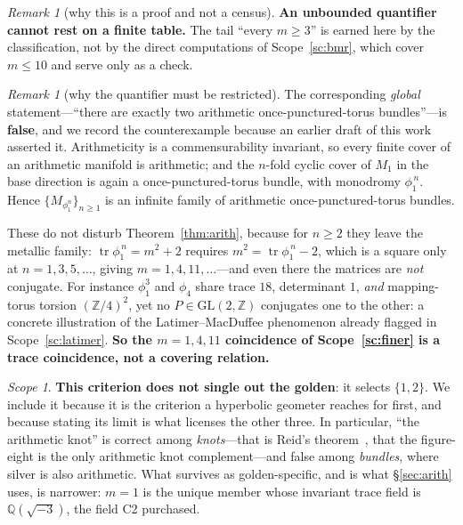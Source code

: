 \documentclass[11pt,reqno]{amsart}
\theoremstyle{plain}
\theoremstyle{definition}
\theoremstyle{remark}
\newtheorem{scope}[theorem]{Scope}
\newtheorem{remark}[theorem]{Remark}
\newcommand{\Q}{\mathbb{Q}}
\newcommand{\Z}{\mathbb{Z}}
\newcommand{\GL}{\mathrm{GL}}
\newcommand{\tr}{\operatorname{tr}}
\begin{document}
\begin{remark}[why this is a proof and not a census]
\textbf{An unbounded quantifier cannot rest on a finite table.} The tail
``every $m\ge3$'' is earned here by the classification, not by the direct computations of
Scope~\ref{sc:bmr}, which cover $m\le10$ and serve only as a check.
\end{remark}

\begin{remark}[why the quantifier must be restricted]\label{rem:notglobal}
The corresponding \emph{global} statement---``there are exactly two arithmetic
once-punctured-torus bundles''---is \textbf{false}, and we record the counterexample
because an earlier draft of this work asserted it. Arithmeticity is a commensurability
invariant, so every finite cover of an arithmetic manifold is arithmetic; and the
$n$-fold cyclic cover of $M_1$ in the base direction is again a once-punctured-torus
bundle, with monodromy $\phi_1^{\,n}$. Hence $\{M_{\phi_1^n}\}_{n\ge1}$ is an infinite
family of arithmetic once-punctured-torus bundles.

These do not disturb Theorem~\ref{thm:arith}, because for $n\ge2$ they leave the
metallic family: $\tr\phi_1^{\,n}=m^2+2$ requires $m^2=\tr\phi_1^{\,n}-2$, which is a
square only at $n=1,3,5,\dots$, giving $m=1,4,11,\dots$---and even there the matrices
are \emph{not} conjugate. For instance $\phi_1^{3}$ and $\phi_4$ share trace $18$,
determinant $1$, \emph{and} mapping-torus torsion $(\Z/4)^2$, yet no
$P\in\GL(2,\Z)$ conjugates one to the other: a concrete illustration of the
Latimer--MacDuffee phenomenon already flagged in Scope~\ref{sc:latimer}. \textbf{So the
$m=1,4,11$ coincidence of Scope~\ref{sc:finer} is a trace coincidence, not a covering
relation.}
\end{remark}

\begin{scope}\label{sc:arithlimit}
\textbf{This criterion does not single out the golden}: it selects $\{1,2\}$. We include
it because it is the criterion a hyperbolic geometer reaches for first, and because
stating its limit is what licenses the other three. In particular, ``the arithmetic
knot'' is correct among \emph{knots}---that is Reid's theorem~\cite{Reid91}, that the
figure-eight is the only arithmetic knot complement---and false among \emph{bundles},
where silver is also arithmetic. What survives as golden-specific, and is what \S\ref{sec:arith} uses,
is narrower: $m=1$ is the unique member whose invariant trace field is $\Q(\sqrt{-3})$,
the field C2 purchased.
\end{scope}
\end{document}
